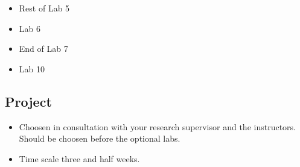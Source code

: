 \documentclass[10pt]{article}
\begin{document}
\begin{itemize}
\item Rest of Lab 5
\item Lab 6
\item End of Lab 7
\item Lab 10
\end{itemize}


\subsection*{Project}

\begin{itemize}
\item Choosen in consultation with your research supervisor and the
instructors.  Should be choosen before the optional labs.
\item Time scale three and half weeks.
\end{itemize}

\clearpage


\end{document}
